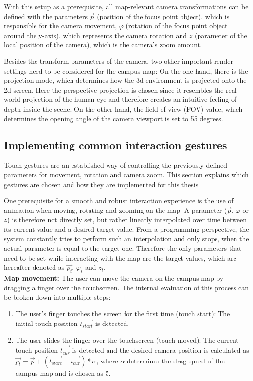 With this setup as a prerequisite, all map-relevant camera transformations can be defined with the parameters $\overrightarrow{p}$ (position of the focus point object), which is responsible for the camera movement, $\varphi$ (rotation of the focus point object around the y-axis), which represents the camera rotation and $z$ (parameter of the local position of the camera), which is the camera's zoom amount.

Besides the transform parameters of the camera, two other important render settings need to be considered for the campus map: On the one hand, there is the projection mode, which determines how the 3d environment is projected onto the 2d screen. Here the perspective projection is chosen since it resembles the real-world projection of the human eye and therefore creates an intuitive feeling of depth inside the scene. On the other hand, the field-of-view (FOV) value, which determines the opening angle of the camera viewport is set to 55 degrees. 

\subsection{Implementing common interaction gestures}
Touch gestures are an established way of controlling the previously defined parameters for movement, rotation and camera zoom. This section explains which gestures are chosen and how they are implemented for this thesis.

One prerequisite for a smooth and robust interaction experience is the use of animation when moving, rotating and zooming on the map. A parameter ($\overrightarrow{p}$, $\varphi$ or $z$) is therefore not directly set, but rather linearly interpolated over time between its current value and a desired target value. From a programming perspective, the system constantly tries to perform such an interpolation and only stops, when the actual parameter is equal to the target one. Therefore the only parameters that need to be set while interacting with the map are the target values, which are hereafter denoted as $\overrightarrow{p_{t}}$, $\varphi_{t}$ and $z_{t}$.\\

\textbf{Map movement:} The user can move the camera on the campus map by dragging a finger over the touchscreen. The internal evaluation of this process can be broken down into multiple steps:

\begin{enumerate}
	\item The user's finger touches the screen for the first time (touch start): The initial touch position $\overrightarrow{t_{start}}$ is detected.
	\item The user slides the finger over the touchscreen (touch moved): The current touch position $\overrightarrow{t_{cur}}$ is detected and the desired camera position is calculated as $\overrightarrow{p_{t}} = \overrightarrow{p} + (\overrightarrow{t_{start}} - \overrightarrow{t_{cur}}) * \alpha$, where $\alpha$ determines the drag speed of the campus map and is chosen as 5.
\end{enumerate}


